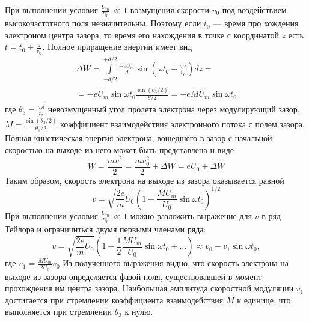 При выполнении условия 
$\frac { U _ { m } } { U _ { 0 } } \ll 1$ возмущения скорости $v_0$ под воздействием высокочастотного поля незначительны. Поэтому если $t_0$ — время про­
хождения электроном центра зазора, то время его нахождения в точке с
координатой $z$ есть $t = t _ { 0 } + \frac { z } { v _ { 0 } }$. Полное приращение энергии имеет вид
\begin{equation}
	\begin{aligned}
		 { \Delta W = \int\limits _ { - d / 2 }^{{ + d / 2 }} \frac { - e U _ { m } } { d } \sin \left( \omega t _ { 0 } + \frac { \omega z } { v _ { 0 } } \right) d z = } \\ 
		 { = - e U _ { m } \sin \omega t _ { 0 } \frac { \sin \left( \theta _ { 3 } / 2 \right) } { \theta / 2 } = - e M U _ { m } \sin \omega t _ { 0 } }
	\end{aligned}
\end{equation}
где $\theta _ { 3 } = \frac { \omega d } { t _ { 0 } }$  невозмущенный угол пролета электрона через модулирующий зазор, 
$M = \frac { \sin \left( \theta _ { 3 } / 2 \right) } { \theta _ { 1 } / 2 }$ коэффициент взаимодействия электронного потока
с полем зазора. Полная кинетическая энергия электрона, вошедшего в зазор
с начальной скоростью на выходе из него может быть представлена н
виде
\begin{equation}
	W = \frac { m v ^ { 2 } } { 2 } = \frac { m v_0 ^ { 2 } } { 2 } + \Delta W = e U _ { 0 } + \Delta W
\end{equation}
Таким образом, скорость электрона на выходе из зазора оказывается равной
\begin{equation}
	v = \sqrt { \frac { 2 e } { m } U _ { 0 } } \left( 1 - \frac { M U _ { m } } { U _ { 0 } } \sin \omega t _ { 0 } \right) ^ { 1 / 2 }
\end{equation}
При выполнении условия $\frac { U _ { m } } { U _ { 0 } } \ll 1$ можно разложить выражение для $v$ в ряд Тейлора и ограничиться двумя первыми членами ряда:
\begin{equation}
	v = \sqrt { \frac { 2 e } { m } U _ { 0 } } \left( 1 - \frac { 1 } { 2 } \frac { M U _ { m } } { U _ { 0 } } \sin \omega t _ { 0 } + \ldots \right) \approx v _ { 0 } - v _ { 1 } \sin \omega t _ { 0 },
\end{equation} где $v _ { 1 } = \frac { M U _ { m } } { 2 U _ { 0 } } v _ { 0 }$
Из полученного выражения видно, что скорость электро­на на выходе из зазора определяется фазой поля, существовавшей в момент
прохождения им центра зазора. Наибольшая амплитуда скоростной моду­ляции $v_1$ достигается при стремлении коэффициента взаимодействия $M$ к 
единице, что выполняется при стремлении $\theta_3$ к нулю.

